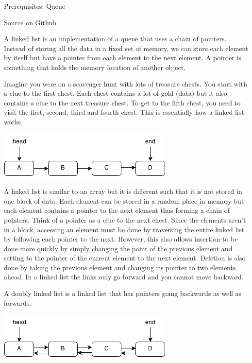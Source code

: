 \documentclass[11pt,oneside]{book}
\makeatletter
\def\maxwidth#1{\ifdim\Gin@nat@width>#1 #1\else\Gin@nat@width\fi}
\makeatother
\begin{document}
Prerequisites: Queue

Source on Github

A linked list is an implementation of a queue that uses a chain of pointers. Instead of storing all the data in a fixed set of memory, we can store each element by itself but have a pointer from each element to the next element. A pointer is something that holds the memory location of another object.

Imagine you were on a scavenger hunt with lots of treasure chests. You start with a clue to the first chest. Each chest contains a lot of gold (data) but it also contains a clue to the next treasure chest. To get to the fifth chest, you need to visit the first, second, third and fourth chest. This is essentially how a linked list works.

\includegraphics[width=\maxwidth{\textwidth}]{linkedlist.png}

A linked list is similar to an array but it is different such that it is not stored in one block of data. Each element can be stored in a random place in memory but each element contains a pointer to the next element thus forming a chain of pointers. Think of a pointer as a clue to the next chest. Since the elements aren't in a block, accessing an element must be done by traversing the entire linked list by following each pointer to the next. However, this also allows insertion to be done more quickly by simply changing the point of the previous element and setting to the pointer of the current element to the next element. Deletion is also done by taking the previous element and changing its pointer to two elements ahead. In a linked list the links only go forward and you cannot move backward.

A doubly linked list is a linked list that has pointers going backwards as well as forwards.

\includegraphics[width=\maxwidth{\textwidth}]{doublelinkedlist.png}
\end{document}
